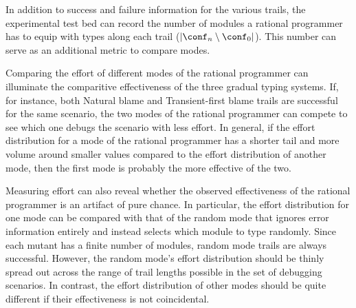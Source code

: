 
In addition to success and failure information for the various trails, the
experimental test bed can record the number of modules a rational programmer has
to equip with types along each trail ($\lvert \conf_n \setminus \conf_0
\rvert$). This number can serve as an additional metric to compare modes.

Comparing the effort of different modes of the rational programmer can
illuminate the comparitive effectiveness of the three gradual typing
systems. If, for instance, both
Natural blame and Transient-first blame trails are successful for the same scenario, the two modes of
the rational programmer can compete to see which one debugs the
scenario with less effort. In general, if the effort distribution for a mode of
the rational programmer has a shorter tail and more volume around smaller values
compared to the effort distribution of another mode, then the first mode is
probably the more effective of the two.

Measuring effort can also reveal whether the observed effectiveness of the
rational programmer is an artifact of pure chance.
In particular, the effort distribution for one mode can be compared with that of
the random mode that ignores error information entirely and instead selects which
module to type randomly.  Since each mutant has a finite number of
modules, random mode trails are always successful. However, the random mode's effort
distribution should be thinly spread out across the range of trail lengths possible
in the set of debugging scenarios.
In contrast, the effort distribution of other modes should be quite different if their effectiveness is not coincidental.
